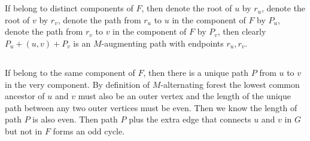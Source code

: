 \documentclass[12pt,letterpaper]{article}
\begin{document}
\section{}
\subsection{}
If belong to distinct components of $F$,
then denote the root of $u$ by $r_{u}$, denote the root of $v$ by $r_{v}$,
denote the path from $r_{u}$ to $u$ in the component of $F$ by $P_{u}$,
denote the path from $r_{v}$ to $v$ in the component of $F$ by $P_{v}$,
then clearly $P_u+(u,v)+P_v$ is an $M$-augmenting path with endpoints $r_u,r_v$.

\subsection{}
If belong to the same component of $F$,
then there is a unique path $P$ from $u$ to $v$ in the very component.
By definition of $M$-alternating forest the lowest common ancestor of $u$ and $v$ must also be an outer vertex 
and the length of the unique path between any two outer vertices must be even.
Then we know the length of path $P$ is also even.
Then path $P$ plus the extra edge that connects $u$ and $v$ in $G$ but not in $F$
forms an odd cycle.

\section{}
\end{document}
